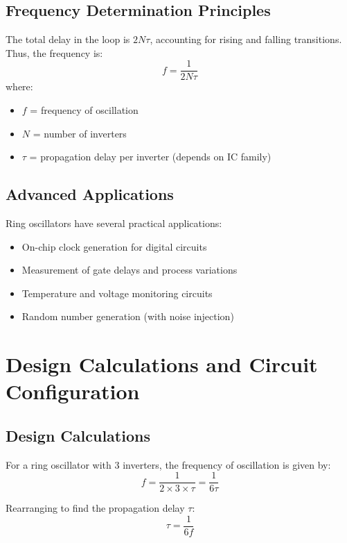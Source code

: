 \documentclass[conference]{IEEEtran}
\begin{document}
\subsection{Frequency Determination Principles}
\noindent The total delay in the loop is $2N\tau$, accounting for rising and falling transitions. Thus, the frequency is:
\begin{equation}
f = \frac{1}{2N\tau}
\end{equation}
\noindent where:
\begin{itemize}
    \item $f$ = frequency of oscillation
    \item $N$ = number of inverters
    \item $\tau$ = propagation delay per inverter (depends on IC family)
\end{itemize}

\subsection{Advanced Applications}
\noindent Ring oscillators have several practical applications:
\begin{itemize}
    \item On-chip clock generation for digital circuits
    \item Measurement of gate delays and process variations
    \item Temperature and voltage monitoring circuits
    \item Random number generation (with noise injection)
\end{itemize}

\section{Design Calculations and Circuit Configuration}

\subsection{Design Calculations}
\noindent For a ring oscillator with 3 inverters, the frequency of oscillation is given by:
\begin{equation}
f = \frac{1}{2 \times 3 \times \tau} = \frac{1}{6\tau}
\end{equation}

\noindent Rearranging to find the propagation delay $\tau$:
\begin{equation}
\tau = \frac{1}{6f}
\end{equation}
\end{document}
